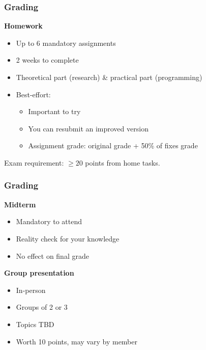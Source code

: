 \begin{frame}
  \frametitle{Grading}

  \textbf{Homework}
  \begin{itemize}[<+(1)->]
    \item Up to 6 mandatory assignments
    \item 2 weeks to complete
    \item Theoretical part (research) \& practical part (programming)
    \item Best-effort:
    \begin{itemize}
      \item Important to try
      \item You can resubmit an improved version
      \item Assignment grade: original grade + 50\% of fixes grade
    \end{itemize}
  \end{itemize}

  \pause
  Exam requirement: $\ge 20$ points from home tasks.
\end{frame}

\begin{frame}
  \frametitle{Grading}

  \pause
  \textbf{Midterm}
  \begin{itemize}
    \item Mandatory to attend
    \item Reality check for your knowledge
    \item No effect on final grade
  \end{itemize}

  \vspace*{1em}

  \pause
  \textbf{Group presentation}
  \begin{itemize}
    \item In-person
    \item Groups of 2 or 3
    \item Topics TBD
    \item Worth 10 points, may vary by member
  \end{itemize}
\end{frame}

